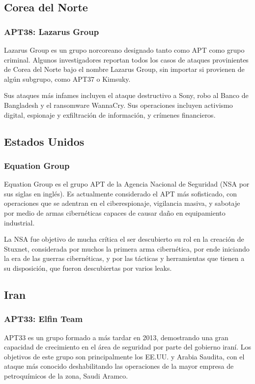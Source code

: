 \documentclass{article}
\begin{document}
\subsection{Corea del Norte}
\subsubsection{APT38: Lazarus Group}
Lazarus Group es un grupo norcoreano designado tanto como APT como grupo criminal. Algunos investigadores reportan todos los casos de ataques provinientes de Corea del Norte bajo el nombre Lazarus Group, sin importar si provienen de algún subgrupo, como APT37 o Kimsuky. \autocite{mitre-lazarus}

Sus ataques más infames incluyen el ataque destructivo a Sony, robo al Banco de Bangladesh y el ransomware WannaCry. Sus operaciones incluyen activismo digital, espionaje y exfiltración de información, y crímenes financieros. \autocite{guardian-lazarus}

\subsection{Estados Unidos}
\subsubsection{Equation Group}
Equation Group es el grupo APT de la Agencia Nacional de Seguridad (NSA por sus siglas en inglés). Es actualmente considerado el APT más sofisticado, con operaciones que se adentran en el ciberespionaje, vigilancia masiva, y sabotaje por medio de armas cibernéticas capaces de causar daño en equipamiento industrial. \autocite{securelist-equation}

La NSA fue objetivo de mucha crítica el ser descubierto su rol en la creación de Stuxnet, considerada por muchos la primera arma cibernética, por ende iniciando la era de las guerras cibernéticas, y por las tácticas y herramientas que tienen a su disposición, que fueron descubiertas por varios leaks. \autocite{washingtonpost-stuxnet}

\subsection{Iran}
\subsubsection{APT33: Elfin Team}
APT33 es un grupo formado a más tardar en 2013, demostrando una gran capacidad de crecimiento en el área de seguridad por parte del gobierno iraní. Los objetivos de este grupo son principalmente los EE.UU. y Arabia Saudita, con el ataque más conocido deshabilitando las operaciones de la mayor empresa de petroquímicos de la zona, Saudi Aramco. \autocite{mandiant-apt33}
\end{document}
